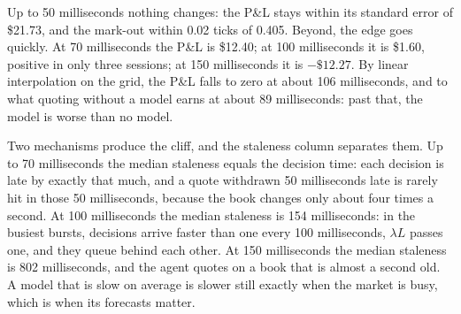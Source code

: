\begin{omfigure}

\label{fig:ml:lob:pnl}
\end{omfigure}

Up to 50 milliseconds nothing changes: the P\&L stays within its standard error of \$21.73, and the mark-out within 0.02 ticks of
0.405. Beyond, the edge goes quickly. At 70 milliseconds the P\&L is \$12.40; at 100 milliseconds it is \$1.60, positive in
only three sessions; at 150 milliseconds it is $-\$12.27$. By linear interpolation on the grid, the P\&L falls to zero at about 106
milliseconds, and to what quoting without a model earns at about 89 milliseconds: past that, the model is worse than no model.

Two mechanisms produce the cliff, and the staleness column separates them. Up to 70 milliseconds the median staleness equals the
decision time: each decision is late by exactly that much, and a quote withdrawn 50 milliseconds late is rarely hit in those 50
milliseconds, because the book changes only about four times a second. At 100 milliseconds the median staleness is 154
milliseconds: in the busiest bursts, decisions arrive faster than one every 100 milliseconds, $\lambda L$ passes one, and they queue
behind each other. At 150 milliseconds the median staleness is 802 milliseconds, and the agent quotes on a book that is almost a
second old. A model that is slow on average is slower still exactly when the market is busy, which is when its forecasts matter.

